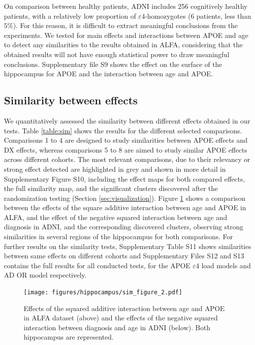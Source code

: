 On comparison between healthy patients, ADNI includes 256 cognitively healthy patients, with a relatively low proportion of $\varepsilon4$-homozygotes (6 patients, less than $5\%$). For this reason, it is difficult to extract meaningful conclusions from the experiments. We tested for main effects and interactions between APOE and age to detect any similarities to the results obtained in ALFA, considering that the obtained results will not have enough statistical power to draw meaningful conclusions. Supplementary file S9 shows the effect on the surface of the hippocampus for APOE and the interaction between age and APOE. \\

\subsection{Similarity between effects}
\label{sec:similarity}

We quantitatively assessed the similarity between different effects obtained in our tests. Table \ref{table:sim} shows the results for the different selected comparisons. Comparisons 1 to 4 are designed to study similarities between APOE effects and DX effects, whereas comparisons 5 to 8 are aimed to study similar APOE effects across different cohorts. The most relevant comparisons, due to their relevancy or strong effect detected are highlighted in grey and shown in more detail in Supplementary Figure S10, including the effect maps for both compared effects, the full similarity map, and the significant clusters discovered after the randomization testing (Section \ref{sec:visualization}). Figure \ref{fig:sim_2} shows a comparison between the effects of the square additive interaction between age and APOE in ALFA, and the effect of the negative squared interaction between age and diagnosis in ADNI, and the corresponding discovered clusters, observing strong similarities in several regions of the hippocampus for both comparisons. For further results on the similarity tests, Supplementary Table S11 shows similarities between same effects on different cohorts and Supplementary Files S12 and S13 contains the full results for all conducted tests, for the APOE $\varepsilon$4 load models and AD OR model respectively. \\

\begin{figure}[htbp]
  \centering
  \texttt{[image: figures/hippocampus/sim\_figure\_2.pdf]}
  \caption[Effects of the squared additive interaction between age and APOE in ALFA.]{Effects of the squared additive interaction between age and APOE in ALFA dataset (above) and the effects of the negative squared interaction between diagnosis and age in ADNI (below). Both hippocampus are represented.}\label{fig:sim_2}
\end{figure}

